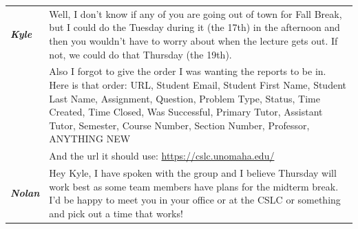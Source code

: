\documentclass[oneside,openany,obeyspaces]{book}
\begin{document}
\begin{flushleft}
\begin{center}
\begin{longtable}{ p{1.5cm} p{13.5cm} }
            \textbf{\textit{Kyle}}  & Well, I don't know if any of you are going out of town for Fall Break, but I could do the Tuesday during it (the 17th) in the afternoon and then you wouldn't have to worry about when the lecture gets out. If not, we could do that Thursday (the 19th).                                                                                                                                                                                                                                                                                                                                                                                                                              \\
                                    & Also I forgot to give the order I was wanting the reports to be in. Here is that order: URL, Student Email, Student First Name, Student Last Name, Assignment, Question, Problem Type, Status, Time Created, Time Closed, Was Successful, Primary Tutor, Assistant Tutor, Semester, Course Number, Section Number, Professor, ANYTHING NEW                                                                                                                                                                                                                                                                                                                                              \\
                                    & And the url it should use: \url{https://cslc.unomaha.edu/}                                                                                                                                                                                                                                                                                                                                                                                                                                                                                                                                                                                                                              \\

            \textbf{\textit{Nolan}} & Hey Kyle, I have spoken with the group and I believe Thursday will work best as some team members have plans for the midterm break. I’d be happy to meet you in your office or at the CSLC or something and pick out a time that works!                                                                                                                                                                                                                                                                                                                                                                                                                                                 \\


\end{longtable}
\end{center}
\end{flushleft}
\end{document}
